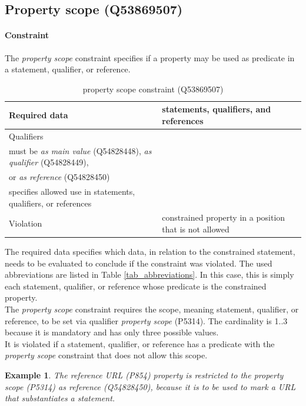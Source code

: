 \documentclass[hyperref,bachelorofscience,fleqn]{cgvpub}
\newtheorem{example}{Example}
\begin{document}
\subsection{Property scope (Q53869507)}
\paragraph{Constraint}
The \emph{property scope} constraint specifies if a property may be used as predicate in a statement, qualifier, or reference.
\begin{table}[H]
\caption{property scope constraint (Q53869507)}
\begin{tabularx}{\textwidth}{ ll X}
\hline
Required data & statements, qualifiers, and references\\
\hline
Qualifiers & \makecell{\emph{property scope} (P5314) -- 1..3 \\ must be \emph{as main value} (Q54828448), \emph{as qualifier} (Q54828449), \\ or \emph{as reference} (Q54828450) \\ specifies allowed use in statements, qualifiers, or references} \\
\hline
Violation & constrained property in a position that is not allowed \\
\hline
\end{tabularx}
\end{table}

The required data specifies which data, in relation to the constrained statement, needs to be evaluated to conclude if the constraint was violated. The used abbreviations are listed in Table \ref{tab_abbreviations}. In this case, this is simply each statement, qualifier, or reference whose predicate is the constrained property.\\
The \emph{property scope} constraint requires the scope, meaning statement, qualifier, or reference, to be set via qualifier \emph{property scope} (P5314). The cardinality is 1..3 because it is mandatory and has only three possible values.\\
It is violated if a statement, qualifier, or reference has a predicate with the \emph{property scope} constraint that does not allow this scope.\\

\begin{example}
The \emph{reference URL} (P854) property is restricted to the \emph{property scope} (P5314) \emph{as reference} (Q54828450), because it is to be used to mark a URL that substantiates a statement.
\end{example}
\end{document}
